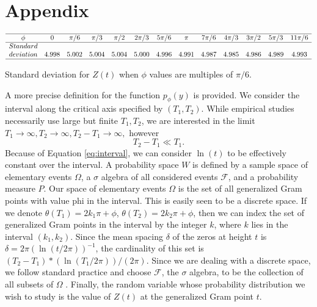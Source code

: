 \documentclass{amsart}
\theoremstyle{definition}
\theoremstyle{remark}
\numberwithin{equation}{section}
\begin{document}
\section*{\label{appendix} Appendix}

\begin{table}
\centering \(\begin{array}{ccccccccccccc}
\hline
\phi & 0& \pi/6 &  \pi/3 &  \pi/2 & 2 \pi/3 & 5\pi/6 & \pi & 7\pi/6 & 4\pi/3 & 3\pi/2 & 5\pi/3 & 11\pi/6 \\
\hline
Standard& \\
deviation & 4.998& 5.002& 5.004& 5.004& 5.000& 4.996& 4.991& 4.987& 4.985& 4.986& 4.989& 4.993\\
\hline
\end{array}\)
\caption{Standard deviation for  $Z(t)$ when $\phi$ values are multiples of $\pi/6$.}
\label{tab:stddev6}
\end{table}

A more precise definition for the function $p_{\phi}(y)$ is provided. We consider the interval along the critical axis specified by $(T_1, T_2)$. While empirical studies necessarily use large but finite  $T_1, T_2$, we are interested in the limit 
$T_1 \rightarrow \infty, T_2 \rightarrow \infty,  T_2-T_1 \rightarrow \infty,$ however
\begin{equation}
T_2 - T_1  \ll T_1. 
\label{eq:interval}
\end{equation}
Because of Equation \ref{eq:interval}, we can consider  $\ln (t)$  to be effectively constant over  the interval. A probability space $W$ is defined by a sample space of elementary events $\Omega$, a $\sigma$ algebra of all considered events $\mathcal{F}$, and a probability measure $P$. Our space of elementary events $\Omega$ is the set of all generalized Gram points with value phi in the interval. This is easily seen to be a discrete space. If we denote $\theta (T_1) = 2k_1\pi + \phi$, $\theta (T_2) = 2k_2\pi + \phi$, then we can index the set of generalized Gram points in the interval by the integer  $k$, where $k$ lies in the interval $(k_1, k_2)$. Since the mean spacing $\delta$ of the zeros at height $t$ is $\delta = 2\pi(\ln (t/2\pi))^{-1}$, the cardinality of this set is $(T_2 - T_1)*(\ln (T_1/2\pi))/(2\pi)$. Since we are dealing with a discrete space, we follow standard practice and choose $\mathcal{F}$,  the  $\sigma$ algebra, to be the collection of all subsets of $\Omega$ . Finally, the random variable whose probability distribution we wish to study is the value of $Z(t)$ at the generalized Gram point $t$.
\end{document}
